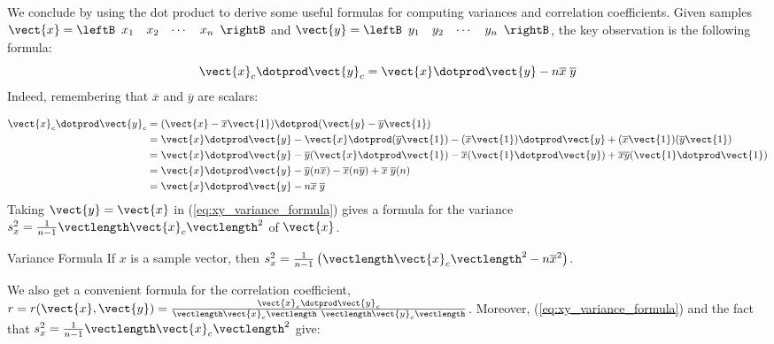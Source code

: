 We conclude by using the dot product to derive some useful formulas for computing variances and correlation coefficients. Given samples $\vect{x} = 
\leftB \begin{array}{cccc}
x_{1} & x_{2} & \cdots & x_{n}
\end{array} \rightB$ and $\vect{y} = 
\leftB \begin{array}{cccc}
y_{1} & y_{2} & \cdots & y_{n}
\end{array} \rightB$, the key observation is the following formula:
\begin{equation}
\label{eq:xy_variance_formula}
\vect{x}_c \dotprod \vect{y}_c = \vect{x} \dotprod \vect{y} - n\overline{x} \; \overline{y}
\end{equation}
Indeed, remembering that $\overline{x}$ and $\overline{y}$ are scalars:

\begin{align*}
\vect{x}_c \dotprod \vect{y}_c &= (\vect{x} - \overline{x}\vect{1}) \dotprod (\vect{y} - \overline{y}\vect{1}) \\
&= \vect{x} \dotprod \vect{y} - \vect{x} \dotprod(\overline{y}\vect{1}) - (\overline{x}\vect{1}) \dotprod \vect{y} + (\overline{x}\vect{1})(\overline{y}\vect{1}) \\
&= \vect{x} \dotprod \vect{y} - \overline{y}(\vect{x} \dotprod \vect{1}) - \overline{x}(\vect{1} \dotprod \vect{y}) + \overline{x}\overline{y}(\vect{1} \dotprod \vect{1}) \\
&= \vect{x} \dotprod \vect{y} - \overline{y}(n\overline{x}) - \overline{x}(n\overline{y}) + \overline{x} \; \overline{y}(n) \\
&= \vect{x} \dotprod \vect{y} - n\overline{x} \; \overline{y}
\end{align*}
Taking $\vect{y} = \vect{x}$ in (\ref{eq:xy_variance_formula}) gives a formula for the variance $s_x^2 = \frac{1}{n - 1} \vectlength \vect{x}_c \vectlength^2$ of $\vect{x}$.

\begin{theorem*}[label=thm:017424]{Variance Formula}
If $x$ is a sample vector, then $s_x^2 = \frac{1}{n - 1} \left( \vectlength \vect{x}_c \vectlength^2 - n\overline{x}^2 \right)$.
\end{theorem*}

\noindent We also get a convenient formula for the correlation coefficient, $r = r(\vect{x}, \vect{y}) = \frac{\vect{x}_c \dotprod \vect{y}_c}{\vectlength \vect{x}_c \vectlength\ \vectlength \vect{y}_c \vectlength}$. Moreover, (\ref{eq:xy_variance_formula}) and the fact that $s_x^2 = \frac{1}{n - 1} \vectlength \vect{x}_c \vectlength^2$ give:

